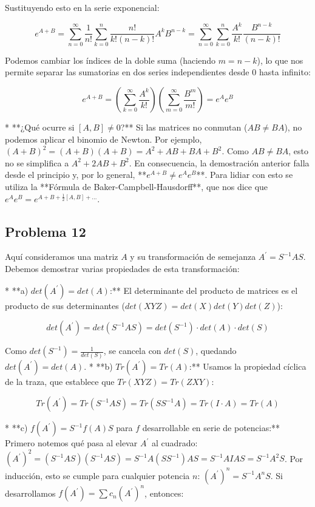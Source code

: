 \documentclass[11pt,spanish]{article}
\begin{document}
Sustituyendo esto en la serie exponencial:

$$e^{A+B} = \sum_{n=0}^{\infty} \frac{1}{n!} \sum_{k=0}^{n} \frac{n!}{k!(n-k)!} A^k B^{n-k} = \sum_{n=0}^{\infty} \sum_{k=0}^{n} \frac{A^k}{k!} \frac{B^{n-k}}{(n-k)!}$$



Podemos cambiar los índices de la doble suma (haciendo $m = n-k$), lo que nos permite separar las sumatorias en dos series independientes desde $0$ hasta infinito:

$$e^{A+B} = \left( \sum_{k=0}^{\infty} \frac{A^k}{k!} \right) \left( \sum_{m=0}^{\infty} \frac{B^m}{m!} \right) = e^{A}e^{B}$$


* **¿Qué ocurre si $[A,B] \neq 0$?**
Si las matrices no conmutan ($AB \neq BA$), no podemos aplicar el binomio de Newton. Por ejemplo, $(A+B)^2 = (A+B)(A+B) = A^2 + AB + BA + B^2$. Como $AB \neq BA$, esto no se simplifica a $A^2 + 2AB + B^2$.
En consecuencia, la demostración anterior falla desde el principio y, por lo general, **$e^{A+B} \neq e^{A}e^{B}$**. Para lidiar con esto se utiliza la **Fórmula de Baker-Campbell-Hausdorff**, que nos dice que $e^{A}e^{B} = e^{A + B + \frac{1}{2}[A,B] + \dots}$.

\subsection*{Problema 12}

Aquí consideramos una matriz $A$ y su transformación de semejanza $A^{\prime} = S^{-1} A S$. Debemos demostrar varias propiedades de esta transformación:

* 
**a) $det(A^{\prime}) = det(A)$:** 
El determinante del producto de matrices es el producto de sus determinantes ($det(XYZ) = det(X)det(Y)det(Z)$):



$$det(A^{\prime}) = det(S^{-1} A S) = det(S^{-1}) \cdot det(A) \cdot det(S)$$



Como $det(S^{-1}) = \frac{1}{det(S)}$, se cancela con $det(S)$, quedando $det(A^{\prime}) = det(A)$.
* 
**b) $Tr(A^{\prime}) = Tr(A)$:** 
Usamos la propiedad cíclica de la traza, que establece que $Tr(XYZ) = Tr(ZXY)$:



$$Tr(A^{\prime}) = Tr(S^{-1} A S) = Tr(S S^{-1} A) = Tr(I \cdot A) = Tr(A)$$


* 
**c) $f(A^{\prime}) = S^{-1} f(A) S$ para $f$ desarrollable en serie de potencias:** 
Primero notemos qué pasa al elevar $A^{\prime}$ al cuadrado:
$(A^{\prime})^2 = (S^{-1} A S)(S^{-1} A S) = S^{-1} A (S S^{-1}) A S = S^{-1} A I A S = S^{-1} A^2 S$.
Por inducción, esto se cumple para cualquier potencia $n$: $(A^{\prime})^n = S^{-1} A^n S$.
Si desarrollamos $f(A^{\prime}) = \sum c_n (A^{\prime})^n$, entonces:
\end{document}
